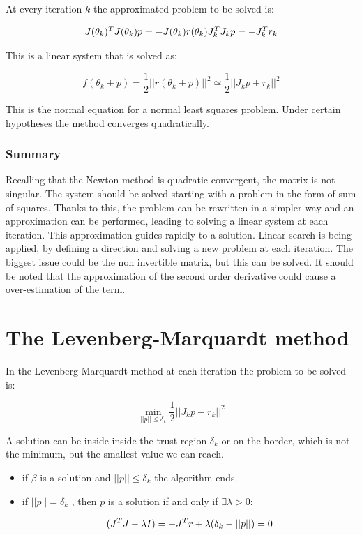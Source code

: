   At every iteration $k$ the approximated problem to be solved is:

  $$J(\theta_k)^TJ(\theta_k)p=-J(\theta_k)r(\theta_k) \\ J_k^TJ_kp=-J_k^T r_k$$

  This is a linear system that is solved as:

  $$f(\theta_k+p)= \frac{1}{2} ||r(\theta_k+p)||^2 \simeq \frac{1}{2} ||J_kp+r_k||^2$$

  This is the normal equation for a normal least squares problem.
  Under certain hypotheses the method converges quadratically.

    \subsubsection{Summary}
    Recalling that the Newton method is quadratic convergent, the matrix is not singular.
    The system should be solved starting with a problem in the form of sum of squares.
    Thanks to this, the problem can be rewritten in a simpler way and an approximation can be performed, leading to solving a linear system at each iteration.
    This approximation guides  rapidly to a solution.
    Linear search is being applied, by defining a direction and solving a new problem at each iteration.
    The biggest issue could be the non invertible matrix, but this can be solved.
    It should be noted that the approximation of the second order derivative could cause a over-estimation of the term.

\section{The Levenberg-Marquardt method}
In the Levenberg-Marquardt method at each iteration the problem to be solved is:

$$\min_{||p||\leq\delta_k} \frac{1}{2} ||J_kp-r_k||^2$$

A solution can be inside inside the trust region $\delta_k$ or on the border, which is not the minimum, but the smallest value we can reach.

\begin{multicols}{2}
  \begin{itemize}
    \item if $\beta$ is a solution and $||p||\leq\delta_k$ the algorithm ends.
    \item if $||p||=\delta_k$ , then $\bar{p}$ is a solution if and only if
      $\exists \lambda > 0$:

      $$(J^TJ-\lambda I)=-J^Tr \\ + \lambda(\delta_k-||p||)=0$$
  \end{itemize}
\end{multicols}
\noindent

